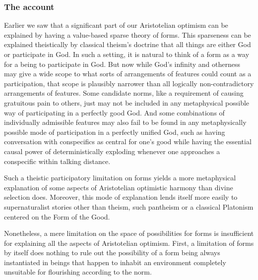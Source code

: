 \subsubsection{The account}
Earlier we saw that a significant part of our Aristotelian optimism can be explained by having a value-based sparse
theory of forms. This sparseness can be explained theistically by classical theism's doctrine 
that all things are either God or participate in God. In such a setting, it is natural to think of a form as a way for 
a being to participate in God. But now while God's infinity and otherness may give a wide scope to what sorts of
arrangements of features could count as a participation, that scope is plausibly narrower than all logically non-contradictory
arrangements of features. Some candidate norms, like a requirement of causing gratuitous pain to others, just may not be included 
in any metaphysical possible way of participating in a perfectly good God. And some combinations of individually admissible features may also 
fail to be found in any metaphysically possible mode of participation in a perfectly unified God, such as having conversation with 
conspecifics as central for one's good while having the essential causal power of deterministically exploding whenever one approaches a 
conspecific within talking distance. 

Such a theistic participatory limitation on forms yields a more metaphysical explanation of some aspects of Aristotelian optimistic harmony than 
divine selection does. Moreover, this mode of explanation lends itself more easily to supernaturalist stories other than theism, 
such pantheism or a classical Platonism centered on the Form of the Good. 

Nonetheless, a mere limitation on the space of possibilities for forms is insufficient for explaining all the aspects of Aristotelian 
optimism. First, a limitation of forms by itself does nothing to rule out the possibility of a form being always instantiated in beings 
that happen to inhabit an environment completely unsuitable for flourishing according to the norm. 

